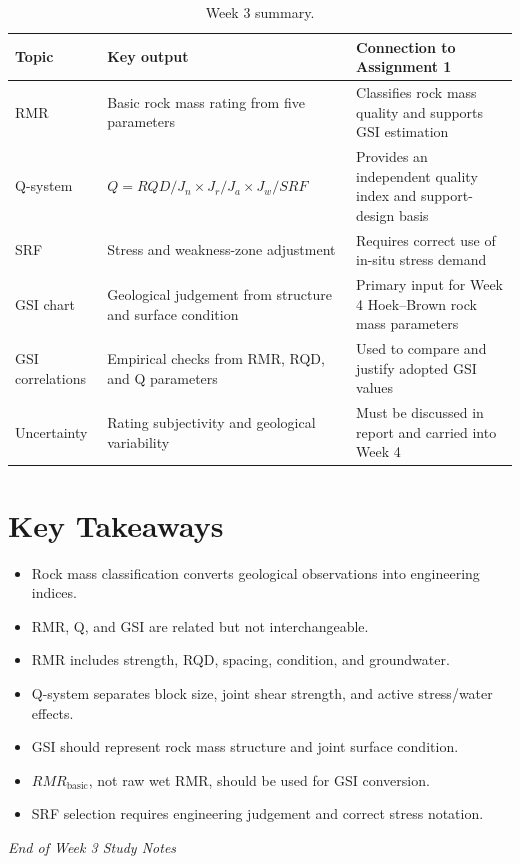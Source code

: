 \documentclass[a4paper,12pt]{article}
\begin{document}
\begin{table}[H]
\centering
\small
\begin{tabularx}{\textwidth}{l Y Y}
\toprule
\textbf{Topic} & \textbf{Key output} & \textbf{Connection to Assignment 1} \\
\midrule
RMR & Basic rock mass rating from five parameters & Classifies rock mass quality and supports GSI estimation \\
Q-system & \(Q = RQD/J_n \times J_r/J_a \times J_w/SRF\) & Provides an independent quality index and support-design basis \\
SRF & Stress and weakness-zone adjustment & Requires correct use of in-situ stress demand \\
GSI chart & Geological judgement from structure and surface condition & Primary input for Week 4 Hoek--Brown rock mass parameters \\
GSI correlations & Empirical checks from RMR, RQD, and Q parameters & Used to compare and justify adopted GSI values \\
Uncertainty & Rating subjectivity and geological variability & Must be discussed in report and carried into Week 4 \\
\bottomrule
\end{tabularx}
\caption{Week 3 summary.}
\label{tab:week3_summary}
\end{table}

\section{Key Takeaways}

\begin{itemize}
    \item Rock mass classification converts geological observations into engineering indices.
    \item RMR, Q, and GSI are related but not interchangeable.
    \item RMR includes strength, RQD, spacing, condition, and groundwater.
    \item  Q-system separates block size, joint shear strength, and active stress/water effects.
    \item GSI should represent rock mass structure and joint surface condition.
    \item \(RMR_{\text{basic}}\), not raw wet RMR, should be used for GSI conversion.
    \item SRF selection requires engineering judgement and correct stress notation.
\end{itemize}

\vspace{1cm}
\noindent\textit{End of Week 3 Study Notes}
\end{document}
